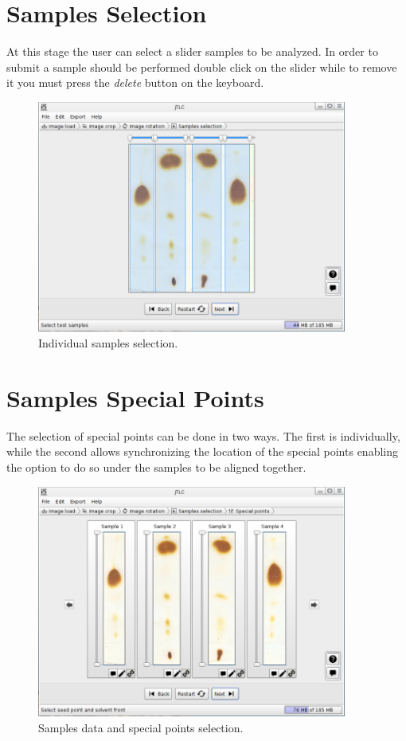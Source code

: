 \section{Samples Selection}
At this stage the user can select a slider samples to be analyzed. In order to submit a sample should be performed double click on the slider while to remove it you must press the \emph{delete} button on the keyboard.
\begin{figure}[H]
	\vspace{0cm}
	\centering
	\includegraphics[width=385px]{imagenes/selection}
	\centering
	\vspace{-0.4cm}
	\caption{Individual samples selection.}
	\label{fig:image_samples_selection}
	\vspace{-0.25cm}
\end{figure}

\section{Samples Special Points}
The selection of special points can be done in two ways. The first is individually, while the second allows synchronizing the location of the special points enabling the option to do so under the samples to be aligned together.
\begin{figure}[H]
	\vspace{0cm}
	\centering
	\includegraphics[width=385px]{imagenes/points}
	\centering
	\vspace{-0.4cm}
	\caption{Samples data and special points selection.}
	\label{fig:image_samples_special_points}
	\vspace{-0.25cm}
\end{figure}


